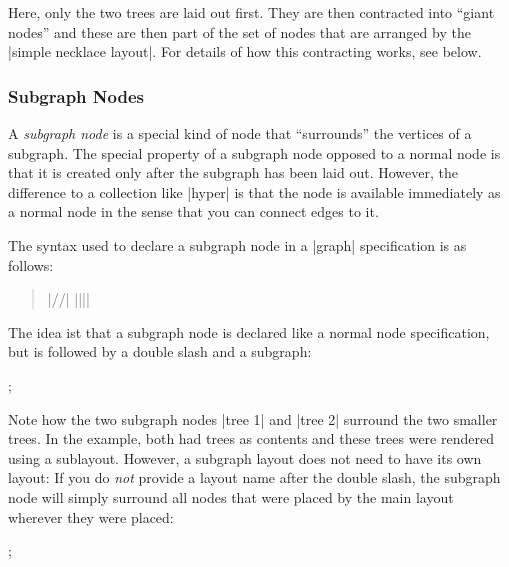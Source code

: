 Here, only the two trees are laid out first. They are then contracted into
``giant nodes'' and these are then part of the set of nodes that are arranged
by the |simple necklace layout|. For details of how this contracting works, see
below.


\subsubsection{Subgraph Nodes}

A \emph{subgraph node} is a special kind of node that ``surrounds'' the
vertices of a subgraph. The special property of a subgraph node opposed to a
normal node is that it is created only after the subgraph has been laid out.
However, the difference to a collection like |hyper| is that the node is
available immediately as a normal node in the sense that you can connect edges
to it.

The syntax used to declare a subgraph node in a |graph| specification is as
follows:
%
\begin{quote}
     |//|  |{||}|
\end{quote}

The idea ist that a subgraph node is declared like a normal node specification,
but is followed by a double slash and a subgraph:
%
\begin{codeexample}[width=5cm]
\tikz {};
\end{codeexample}

Note how the two subgraph nodes |tree 1| and |tree 2| surround the two smaller
trees. In the example, both had trees as contents and these trees were rendered
using a sublayout. However, a subgraph layout does not need to have its own
layout: If you do \emph{not} provide a layout name after the double slash, the
subgraph node will simply surround all nodes that were placed by the main
layout wherever they were placed:
%
\begin{codeexample}[]
\tikz [subgraph text bottom=text centered,
       subgraph nodes={font=\itshape}]
  ;
\end{codeexample}

